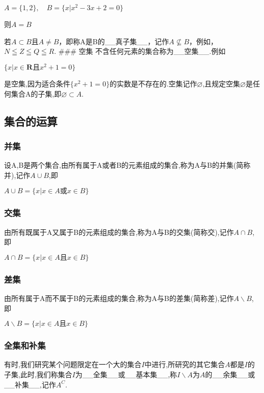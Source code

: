 \documentclass[11pt]{article}
\begin{document}
\(A=\{1,2\}, \quad B=\{x| x^{2}-3 x+2=0 \}\)

则\(A = B\)

若\(A \subset B\)且\(A \neq B\)，即称A是B的\_\_真子集\_\_，记作\(A \nsubseteq B\)，例如，\(N \leqq Z \leqq Q \leqq R\).
\#\#\# 空集 不含任何元素的集合称为\_\_空集\_\_.例如

\(\{x | x \in \mathbf{R}且x^{2}+1=0 \}\)

是空集,因为适合条件\(\{x^{2}+1=0 \}\)的实数是不存在的.空集记作\(\varnothing\),且规定空集\(\varnothing\)是任何集合A的子集,即\(\varnothing \subset A\).

\subsection{集合的运算}\label{ux96c6ux5408ux7684ux8fd0ux7b97}

\subsubsection{并集}\label{ux5e76ux96c6}

设A,B是两个集合,由所有属于A或者B的元素组成的集合,称为A与B的并集(简称并),记作\(A \cup B\),即

\(A \cup B=\{x| x \in A或 x \in B \}\)

\subsubsection{交集}\label{ux4ea4ux96c6}

由所有既属于A又属于B的元素组成的集合,称为A与B的交集(简称交),记作\(A \cap B\),即

\(A \cap B=\{x| x \in A且 x \in B \}\)

\subsubsection{差集}\label{ux5deeux96c6}

由所有属于A而不属于B的元素组成的集合,称为A与B的差集(简称差),记作\(A \backslash B\),即

\(A \backslash B=\{x| x \in A且 x \in B \}\)

\subsubsection{全集和补集}\label{ux5168ux96c6ux548cux8865ux96c6}

有时,我们研究某个问题限定在一个大的集合\(I\)中进行,所研究的其它集合\(A\)都是\(I\)的子集,此时,我们称集合\(I\)为\_\_全集\_\_或\_\_基本集\_\_,称\(I\backslash A\)为\(A\)的\_\_余集\_\_或\_\_补集\_\_,记作\(A^{C}\).
\end{document}
